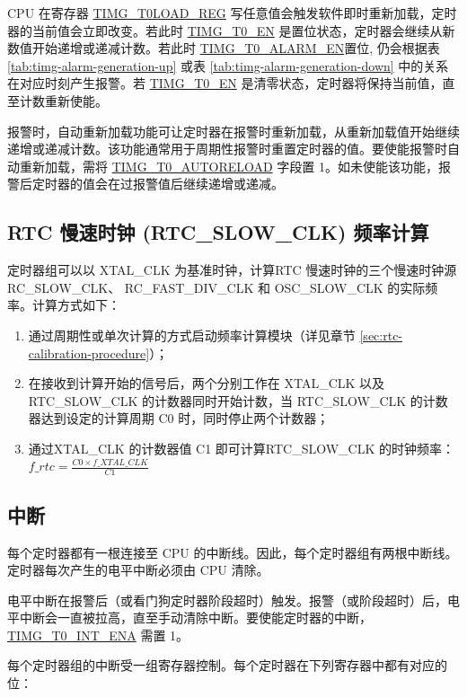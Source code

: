 \documentclass[main\_\_CN.tex]{subfiles}
\begin{document}
CPU 在寄存器 \hyperref[regdesc:TIMGTXLOADREG]{TIMG\_T0LOAD\_REG} 写任意值会触发软件即时重新加载，定时器的当前值会立即改变。若此时 \hyperref[fielddesc:TIMGTXEN]{TIMG\_T0\_EN} 是置位状态，定时器会继续从新数值开始递增或递减计数。若此时 \hyperref[fielddesc:TIMGTXALARMEN]{TIMG\_T0\_ALARM\_EN}置位, 仍会根据表 \ref{tab:timg-alarm-generation-up} 或表 \ref{tab:timg-alarm-generation-down} 中的关系在对应时刻产生报警。若 \hyperref[fielddesc:TIMGTXEN]{TIMG\_T0\_EN} 是清零状态，定时器将保持当前值，直至计数重新使能。

报警时，自动重新加载功能可让定时器在报警时重新加载，从重新加载值开始继续递增或递减计数。该功能通常用于周期性报警时重置定时器的值。要使能报警时自动重新加载，需将 \hyperref[fielddesc:TIMGTXAUTORELOAD]{TIMG\_T0\_AUTORELOAD} 字段置 1。如未使能该功能，报警后定时器的值会在过报警值后继续递增或递减。


\subsection{RTC 慢速时钟 (RTC\_SLOW\_CLK) 频率计算}\label{sec:rtc-calibration-desc}
定时器组可以以 XTAL\_CLK 为基准时钟，计算RTC 慢速时钟的三个慢速时钟源 RC\_SLOW\_CLK、 RC\_FAST\_DIV\_CLK 和 OSC\_SLOW\_CLK 的实际频率。计算方式如下：
\begin{enumerate}
    \item 通过周期性或单次计算的方式启动频率计算模块（详见章节 \ref{sec:rtc-calibration-procedure}）；
    \item 在接收到计算开始的信号后，两个分别工作在 XTAL\_CLK 以及 RTC\_SLOW\_CLK 的计数器同时开始计数，当 RTC\_SLOW\_CLK 的计数器达到设定的计算周期 C0 时，同时停止两个计数器；
    \item 通过XTAL\_CLK 的计数器值 C1 即可计算RTC\_SLOW\_CLK 的时钟频率：$f\_rtc = \frac{C0 \times f\_XTAL\_CLK}{C1}$
\end{enumerate}

\subsection{中断}\label{sec:timg-interrupt}
每个定时器都有一根连接至 CPU 的中断线。因此，每个定时器组有两根中断线。定时器每次产生的电平中断必须由 CPU 清除。

电平中断在报警后（或看门狗定时器阶段超时）触发。报警（或阶段超时）后，电平中断会一直被拉高，直至手动清除中断。要使能定时器的中断，\hyperref[fielddesc:TIMGT0INTENA]{TIMG\_T0\_INT\_ENA} 需置 1。

每个定时器组的中断受一组寄存器控制。每个定时器在下列寄存器中都有对应的位：
\end{document}
